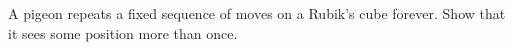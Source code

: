 A pigeon repeats a fixed sequence of moves on a Rubik's cube forever. Show that it sees some position more than once.
